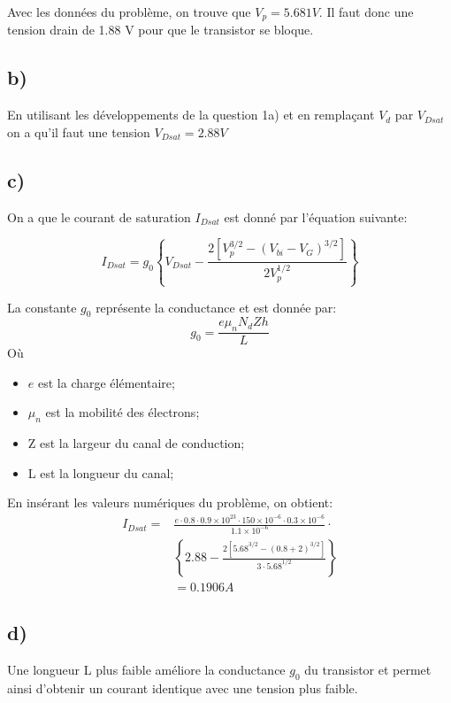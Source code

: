Avec les données du problème, on trouve que $V_p = 5.681 V$. Il faut donc une tension drain de 1.88 V pour que le transistor se bloque.

\subsection*{b)}
En utilisant les développements de la question 1a) et en remplaçant $V_d$ par $V_{Dsat}$ on a qu'il faut une tension $V_{Dsat} = 2.88V$

\subsection*{c)}
On a que le courant de saturation $I_{Dsat}$ est donné par l'équation suivante:

\begin{equation}
I_{Dsat} = g_0 \left \lbrace V_{Dsat} - \frac{2\left[V_p^{3/2} - (V_{bi}-V_G)^{3/2}\right]}{2V_p^{1/2}}\right\rbrace
\end{equation}

La constante $g_0$ représente la conductance et est donnée par:
\begin{equation}
g_0 = \frac{e \mu_n N_d Zh}{L}
\end{equation}
Où
\begin{itemize}
\item $e$ est la charge élémentaire;
\item $\mu_n$ est la mobilité des électrons;
\item Z est la largeur du canal de conduction;
\item L est la longueur du canal;
\end{itemize}

En insérant les valeurs numériques du problème, on obtient: 
\begin{align}
I_{Dsat} = &\frac{e\cdot 0.8 \cdot 0.9\times 10^{23} \cdot 150\times 10^{-6} \cdot 0.3\times 10^{-6}}{1.1\times 10^{-6}}\cdot\\ 
&\left\lbrace 2.88 - \frac{2\left[5.68^{3/2} - (0.8+2)^{3/2}\right]}{3\cdot 5.68^{1/2}}\right\rbrace\\
&= 0.1906A
\end{align}
\subsection*{d)}

Une longueur L plus faible améliore la conductance $g_0$ du transistor et permet ainsi d'obtenir un courant identique avec une tension plus faible.


